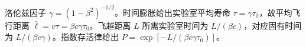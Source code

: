 洛伦兹因子 $\gamma=(1-\beta^2)^{-1/2}$。时间膨胀给出实验室平均寿命 $\tau=\gamma\tau_0$，故平均飞行距离 $\bar\ell=v\tau=\beta c\gamma\tau_0$。飞越距离 $L$ 所需实验室时间为 $L/(\beta c)$，对应固有时间为 $L/(\beta c\gamma)$。指数存活律给出 $P=\exp[-L/(\beta c\gamma\tau_0)]$。
